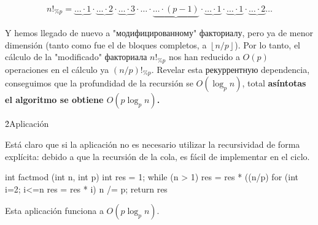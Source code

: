 $$ n!_{\%p} = \underbrace{ \ldots \cdot 1 } \cdot \underbrace{ \ldots \cdot 2 } \cdot \underbrace{ \ldots \cdot 3 } \cdot \ldots \cdot \underbrace{ \ldots \cdot (p-1) } \cdot \underbrace{ \ldots \cdot 1 } \cdot \underbrace{ \ldots \cdot 1 } \cdot \underbrace{ \ldots \cdot 2 } \ldots $$

Y hemos llegado de nuevo a "модифицированному" факториалу, pero ya de menor dimensión (tanto como fue el de bloques completos, a $\left\lfloor n / p \right\rfloor$). Por lo tanto, el cálculo de la "modificado" факториала $n!_{\%p}$ nos han reducido a $O(p)$ operaciones en el cálculo ya $(n/p)!_{\%p}$. Revelar esta рекуррентную dependencia, conseguimos que la profundidad de la recursión se $O (\log_p n)$, total \bf{asíntotas} el algoritmo se obtiene $O(p \log_p n)$.

\h2{Aplicación}

Está claro que si la aplicación no es necesario utilizar la recursividad de forma explícita: debido a que la recursión de la cola, es fácil de implementar en el ciclo.

\code
int factmod (int n, int p) {
int res = 1;
while (n > 1) {
res = res * ((n/p) %
for (int i=2; i<=n%
res = res * i) %
n /= p;
}
return res %
}
\endcode

Esta aplicación funciona a $O(p \log_p n)$.